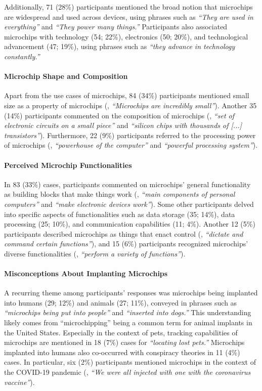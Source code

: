 Additionally, 71 (28\%) participants mentioned the broad notion that microchips are widespread and used across devices, using phrases such as \textit{\enquote{They are used in everything}} and \textit{\enquote{They power many things.}} 
Participants also associated microchips with technology (54; 22\%), electronics (50; 20\%), and technological advancement (47; 19\%), using phrases such as \textit{\enquote{they advance in technology constantly.}}

\paragraph{Microchip Shape and Composition}
Apart from the use cases of microchips, 84 (34\%) participants mentioned small size as a property of microchips (\eg, \textit{\enquote{Microchips are incredibly small}}). 
Another 35 (14\%) participants commented on the composition of microchips (\eg, \textit{\enquote{set of electronic circuits on a small piece}} and \textit{\enquote{silicon chips with thousands of [...] transistors}}). 
Furthermore, 22 (9\%) participants referred to the processing power of microchips (\eg, \textit{\enquote{powerhouse of the computer}} and \textit{\enquote{powerful processing system}}). 

\paragraph{Perceived Microchip Functionalities}
In 83 (33\%) cases, participants commented on microchips' general functionality as building blocks that make things work (\eg, \textit{\enquote{main components of personal computers}} and \textit{\enquote{make electronic devices work}}).
Some other participants delved into specific aspects of functionalities such as data storage (35; 14\%), data processing (25; 10\%), and communication capabilities (11; 4\%). 
Another 12 (5\%) participants described microchips as things that enact control (\eg, \textit{\enquote{dictate and command certain functions}}), and 15 (6\%) participants recognized microchips' diverse functionalities (\eg, \textit{\enquote{perform a variety of functions}}).

\paragraph{Misconceptions About Implanting Microchips}
A recurring theme among participants' responses was microchips being implanted into humans (29; 12\%) and animals (27; 11\%), conveyed in phrases such as \textit{\enquote{microchips being put into people}} and \textit{\enquote{inserted into dogs.}} 
This understanding likely comes from \enquote{microchipping} being a common term for animal implants in the United States.
Especially in the context of pets, tracking capabilities of microchips are mentioned in 18 (7\%) cases for \textit{\enquote{locating lost pets.}}
Microchips implanted into humans also co-occurred with conspiracy theories in 11 (4\%) cases.
In particular, six (2\%) participants mentioned microchips in the context of the COVID-19 pandemic (\eg, \textit{\enquote{We were all injected with one with the coronavirus vaccine}}).

